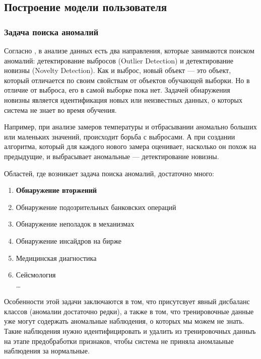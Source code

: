 \documentclass[12pt]{article}
\begin{document}
    \newpage


    \subsection{Построение модели пользователя}
    \label{sec:Research:Model}
    
    \subsubsection{Задача поиска аномалий}
    \label{sec:Research:Model:Anomaly}

    \par Согласно \cite{Dyakonov, NoveltyDetection}, в анализе данных есть два направления, которые занимаются поиском аномалий: детектирование выбросов (Outlier Detection) и детектирование новизны (Novelty Detection). Как и выброс, новый объект — это объект, который отличается по своим свойствам от объектов обучающей выборки. Но в отличие от выброса, его в самой выборке пока нет. Задачей обнаружения новизны является идентификация новых или неизвестных данных, о которых система не знает во время обучения. \\

    \par Например, при анализе замеров температуры и отбрасывании аномально больших или маленьких значений, происходит борьба с выбросами. А при создании алгоритма, который для каждого нового замера оценивает, насколько он похож на предыдущие, и выбрасывает аномальные — детектирование новизны. \\

    \par Областей, где возникает задача поиска аномалий, достаточно много:

    \begin{enumerate}
        \item \textbf{Обнаружение вторжений}
        \item Обнаружение подозрительных банковских операций
         \item Обнаружение неполадок в механизмах
        \item Обнаружение инсайдров на бирже
        \item Медицинская диагностика
        \item Сейсмология \\
        \ldots
    \end{enumerate}

    \par Особенности этой задачи заключаются в том, что присутсвует явный дисбаланс классов (аномалии достаточно редки), а также в том, что тренировочные данные уже могут содержать аномальные наблюдения, о которых мы можем не знать. Такие наблюдения нужно идентифицировать и удалить из тренировочных данныъ на этапе предобработки признаков, чтобы система не приняла аномлаьные наблюдения за нормальные. \\
    
\end{document}
